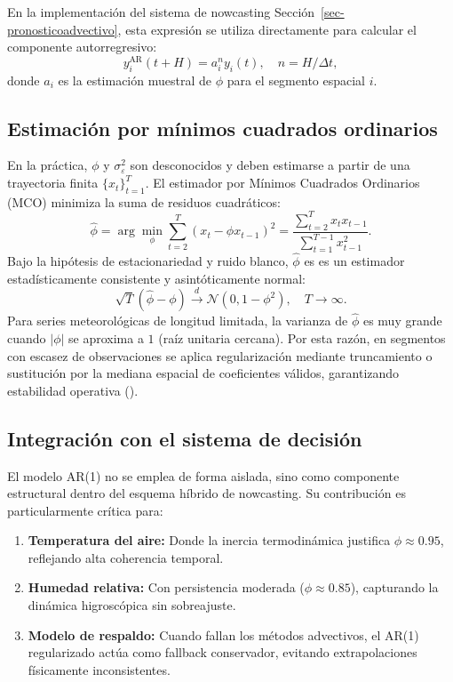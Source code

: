 \documentclass[
  spanish,
  us-letterpaper,
]{scrreprt}
\providecommand{\tightlist}{%
  \setlength{\itemsep}{0pt}\setlength{\parskip}{0pt}}
\numberwithin{equation}{section}
\begin{document}
En la implementación del sistema de nowcasting
Sección~\ref{sec-pronosticoadvectivo}, esta expresión se utiliza
directamente para calcular el componente autorregresivo: \[
y_i^{\text{AR}}(t+H) = a_i^{n} y_i(t), \quad n = H/\Delta t,
\] donde \(a_i\) es la estimación muestral de \(\phi\) para el segmento
espacial \(i\).

\subsection{Estimación por mínimos cuadrados
ordinarios}\label{estimaciuxf3n-por-muxednimos-cuadrados-ordinarios}

En la práctica, \(\phi\) y \(\sigma_\varepsilon^2\) son desconocidos y
deben estimarse a partir de una trayectoria finita \(\{x_t\}_{t=1}^T\).
El estimador por Mínimos Cuadrados Ordinarios (MCO) minimiza la suma de
residuos cuadráticos: \[
\hat{\phi} = \arg\min_{\phi} \sum_{t=2}^T (x_t - \phi x_{t-1})^2 = \frac{\sum_{t=2}^T x_t x_{t-1}}{\sum_{t=1}^{T-1} x_{t-1}^2}.
\] Bajo la hipótesis de estacionariedad y ruido blanco, \(\hat{\phi}\)
es es un estimador estadísticamente consistente y asintóticamente
normal: \[
\sqrt{T}(\hat{\phi} - \phi) \xrightarrow{d} \mathcal{N}\left(0, 1-\phi^2\right), \quad T \to \infty.
\] Para series meteorológicas de longitud limitada, la varianza de
\(\hat{\phi}\) es muy grande cuando \(|\phi|\) se aproxima a \(1\) (raíz
unitaria cercana). Por esta razón, en segmentos con escasez de
observaciones se aplica regularización mediante truncamiento o
sustitución por la mediana espacial de coeficientes válidos,
garantizando estabilidad operativa ().

\subsection{Integración con el sistema de
decisión}\label{integraciuxf3n-con-el-sistema-de-decisiuxf3n}

El modelo AR(1) no se emplea de forma aislada, sino como componente
estructural dentro del esquema híbrido de nowcasting. Su contribución es
particularmente crítica para:

\begin{enumerate}
\def\labelenumi{\arabic{enumi}.}
\tightlist
\item
  \textbf{Temperatura del aire:} Donde la inercia termodinámica
  justifica \(\phi \approx 0.95\), reflejando alta coherencia temporal.
\item
  \textbf{Humedad relativa:} Con persistencia moderada
  (\(\phi \approx 0.85\)), capturando la dinámica higroscópica sin
  sobreajuste.
\item
  \textbf{Modelo de respaldo:} Cuando fallan los métodos advectivos, el
  AR(1) regularizado actúa como fallback conservador, evitando
  extrapolaciones físicamente inconsistentes.
\end{enumerate}
\end{document}
